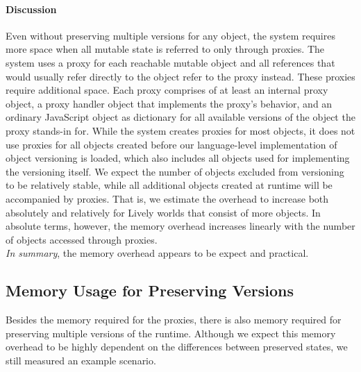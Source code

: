 \paragraph{Discussion}
Even without preserving multiple versions for any object, the system requires more space when all mutable state is referred to only through proxies.
The system uses a proxy for each reachable mutable object and all references that would usually refer directly to the object refer to the proxy instead.
These proxies require additional space.
Each proxy comprises of at least an internal proxy object, a proxy handler object that implements the proxy's behavior, and an ordinary JavaScript object as dictionary for all available versions of the object the proxy stands-in for.
While the system creates proxies for most objects, it does not use proxies for all objects created before our language-level implementation of object versioning is loaded, which also includes all objects used for implementing the versioning itself.
We expect the number of objects excluded from versioning to be relatively stable, while all additional objects created at runtime will be accompanied by proxies.
That is, we estimate the overhead to increase both absolutely and relatively for Lively worlds that consist of more objects.
In absolute terms, however, the memory overhead increases linearly with the number of objects accessed through proxies.\\
\emph{In summary}, the memory overhead appears to be expect and practical.


\subsection{Memory Usage for Preserving Versions}

Besides the memory required for the proxies, there is also memory required for preserving multiple versions of the runtime.
Although we expect this memory overhead to be highly dependent on the differences between preserved states, we still measured an example scenario.


